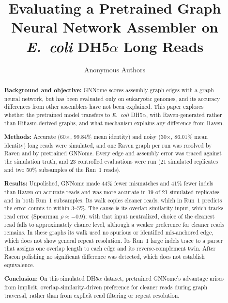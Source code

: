 \documentclass[a4paper]{llncs}
\begin{document}
\title{Evaluating a Pretrained Graph Neural Network Assembler on \emph{E.\ coli} DH5$\alpha$ Long Reads}
\author{Anonymous Authors}
\maketitle

\begin{abstract}
\textbf{Background and objective:} GNNome scores assembly-graph edges with a graph neural network, but has been evaluated only on eukaryotic genomes, and its accuracy differences from other assemblers have not been explained. This paper explores whether the pretrained model transfers to \emph{E.\ coli} DH5$\alpha$, with Raven-generated rather than Hifiasm-derived graphs, and what mechanism explains any difference from Raven.

\textbf{Methods:} Accurate (60$\times$, 99.84\% mean identity) and noisy (30$\times$, 86.01\% mean identity) long reads were simulated, and one Raven graph per run was resolved by Raven and by pretrained GNNome. Every edge and assembly error was traced against the simulation truth, and 23 controlled evaluations were run (21 simulated replicates and two 50\% subsamples of the Run~1 reads).

\textbf{Results:} Unpolished, GNNome made 44\% fewer mismatches and 41\% fewer indels than Raven on accurate reads and was more accurate in 19 of 21 simulated replicates and in both Run~1 subsamples. Its walk copies cleaner reads, which in Run~1 predicts the error counts to within 3--5\%. The cause is its overlap-similarity input, which tracks read error (Spearman $\rho \approx -0.9$); with that input neutralized, choice of the cleanest read falls to approximately chance level, although a weaker preference for cleaner reads remains. In these graphs its walk used no spurious or identified mis-anchored edge, which does not show general repeat resolution. Its Run~1 large indels trace to a parser that assigns one overlap length to each edge and its reverse-complement twin. After Racon polishing no significant difference was detected, which does not establish equivalence.

\textbf{Conclusion:} On this simulated DH5$\alpha$ dataset, pretrained GNNome's advantage arises from implicit, overlap-similarity-driven preference for cleaner reads during graph traversal, rather than from explicit read filtering or repeat resolution.

\end{abstract}
\end{document}
